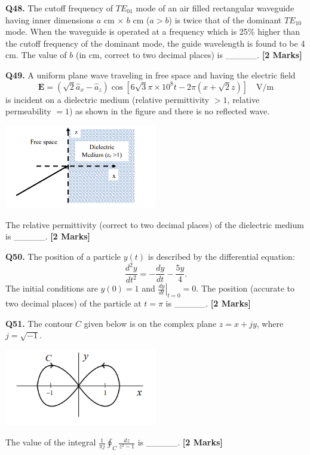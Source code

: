 \documentclass[11pt]{article}
\newcommand{\questionb}[2]{
    \noindent\textbf{Q#2.} #1 \hfill \textbf{[2 Marks]}
}
\begin{document}
\questionb{The cutoff frequency of $TE_{01}$ mode of an air filled rectangular waveguide having inner dimensions $a$ cm $\times$ $b$ cm ($a > b$) is twice that of the dominant $TE_{10}$ mode. When the waveguide is operated at a frequency which is 25\% higher than the cutoff frequency of the dominant mode, the guide wavelength is found to be 4 cm. The value of $b$ (in cm, correct to two decimal places) is \_\_\_\_\_.}{48}

\vspace{0.5cm}

\questionb{A uniform plane wave traveling in free space and having the electric field
\[
\mathbf{E} = (\sqrt{2}\hat{a}_x - \hat{a}_z)\cos[6\sqrt{3}\pi \times 10^8 t - 2\pi(x + \sqrt{2}z)] \quad \text{V/m}
\]
is incident on a dielectric medium (relative permittivity $> 1$, relative permeability $= 1$) as shown in the figure and there is no reflected wave.

\begin{center}
\includegraphics[width=0.5\textwidth]{figures/49.png}
\end{center}

The relative permittivity (correct to two decimal places) of the dielectric medium is \_\_\_\_\_.}{49}

\vspace{0.5cm}

\questionb{The position of a particle $y(t)$ is described by the differential equation:
\[
\frac{d^2y}{dt^2} = -\frac{dy}{dt} - \frac{5y}{4}.
\]
The initial conditions are $y(0) = 1$ and $\left.\frac{dy}{dt}\right|_{t=0} = 0$. The position (accurate to two decimal places) of the particle at $t = \pi$ is \_\_\_\_\_.}{50}

\vspace{0.5cm}

\questionb{The contour $C$ given below is on the complex plane $z = x + jy$, where $j = \sqrt{-1}$.

\begin{center}
\includegraphics[width=0.5\textwidth]{figures/51.png}
\end{center}

The value of the integral $\frac{1}{\pi j} \oint_C \frac{dz}{z^2 - 1}$ is \_\_\_\_\_.}{51}
\end{document}
